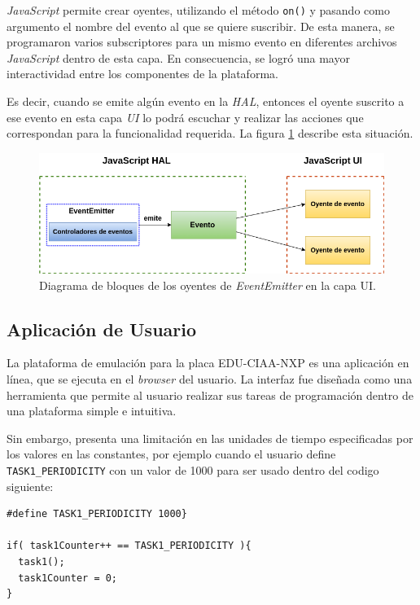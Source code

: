 \textit{JavaScript} permite crear oyentes, utilizando el método \texttt{on()} y pasando como argumento el nombre del evento al que se quiere suscribir. De esta manera, se  programaron varios subscriptores para un mismo evento en diferentes archivos \textit{JavaScript} dentro de esta capa. En consecuencia, se logró una mayor interactividad entre los componentes de la plataforma.

Es decir, cuando se emite algún evento en la \textit{HAL}, entonces el oyente suscrito a ese evento en esta capa \textit{UI} lo podrá escuchar y realizar las acciones que correspondan para la funcionalidad requerida. La figura \ref{fig:EventemitterNodeJSUI} describe esta situación.

\begin{figure}[ht]
	\centering
	\includegraphics[scale=.52]{./Figures/EventemitterNodeJSUI.png}
	\caption{Diagrama de bloques de los oyentes de \textit{EventEmitter} en la capa UI.}
	\label{fig:EventemitterNodeJSUI}
\end{figure}

\subsection{Aplicación de Usuario}

La plataforma de emulación para la placa EDU-CIAA-NXP es una aplicación en línea, que se ejecuta en el \textit{browser} del usuario. La interfaz fue diseñada como una herramienta que permite al usuario realizar sus tareas de programación dentro de una plataforma simple e intuitiva.

Sin embargo, presenta una limitación en las unidades de tiempo especificadas por los valores en las constantes, por ejemplo cuando el usuario define \texttt{TASK1\_PERIODICITY} con un valor de 1000 para ser usado dentro del codigo siguiente: 
	
\begin{lstlisting}[caption={Ejemplo TASK1\_PERIODICITY}]
#define TASK1_PERIODICITY 1000} 

if( task1Counter++ == TASK1_PERIODICITY ){
  task1();
  task1Counter = 0;
}
\end{lstlisting}	

